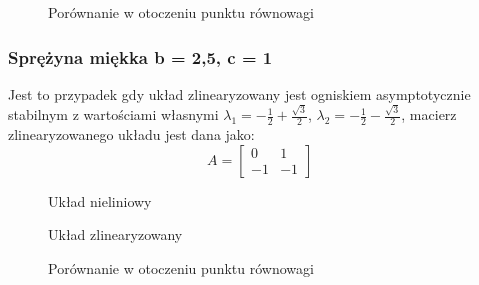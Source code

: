 \documentclass[a4paper, 10pt]{article}
\begin{document}
				
				\begin{figure}[H]
					\centering
					\def \svgwidth{0.8\columnwidth}
					
					\caption{Porównanie w otoczeniu punktu równowagi}
				\end{figure}\noindent
				
			\subsubsection{Sprężyna miękka b = 2,5, c = 1}
				Jest to przypadek gdy układ zlinearyzowany jest ogniskiem asymptotycznie stabilnym z wartościami własnymi $\lambda_1 = -\frac{1}{2} + \frac{\sqrt{3}}{2}$, $\lambda_2 = -\frac{1}{2} - \frac{\sqrt{3}}{2}$, macierz zlinearyzowanego układu jest dana jako:
				$$
				A = \begin{bmatrix}
				0 & 1 \\
				-1  & -1
				\end{bmatrix}
				$$
				\begin{figure}[H]
					\centering
					\def \svgwidth{0.8\columnwidth}
					
					\caption{Układ nieliniowy}
				\end{figure}\noindent
				
				
				\begin{figure}[H]
					\centering
					\def \svgwidth{0.8\columnwidth}
					
					\caption{Układ zlinearyzowany}
				\end{figure}\noindent
				
				
				\begin{figure}[H]
					\centering
					\def \svgwidth{0.8\columnwidth}
					
					\caption{Porównanie w otoczeniu punktu równowagi}
				\end{figure}\noindent
				
				
				
				
\end{document}
